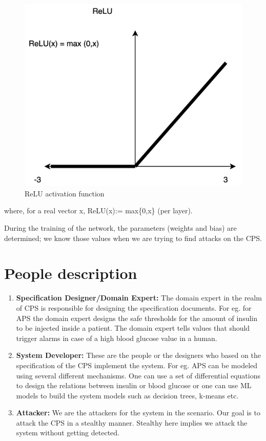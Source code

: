 \begin{figure}
	\centering
	\includegraphics[width=0.7\linewidth]{Images/ReLU}
	\caption[Activation functions]{ReLU activation function}
	\label{fig:ReLU}
\end{figure}
where, for a real vector x, ReLU(x):= max\{0,x\} (per layer).

During the training of the network, the parameters (weights and bias) are determined; we know those values when we are trying to find attacks on the CPS.


\section{People description}

\begin{enumerate}
	\item \textbf{Specification Designer/Domain Expert:} The domain expert in the realm of \ac{CPS} is responsible for designing the specification documents. For eg. for \ac{APS} the domain expert designs the safe thresholds for the amount of insulin to be injected inside a patient. The domain expert tells values that should trigger alarms in case of a high blood glucose value in a human. 
	
	\item \textbf{System Developer:} These are the people or the designers who based on the specification of the CPS implement the system. For eg. \ac{APS} can be modeled using several different mechanisms. One can use a set of differential equations to design the relations between insulin or blood glucose or one can use \ac{ML} models to build the system models such as decision trees, k-means etc. 
	
	\item \textbf{Attacker:} We are the attackers for the system in the scenario. Our goal is to attack the \ac{CPS} in a stealthy manner. Stealthy here implies we attack the system without getting detected. 
\end{enumerate}



